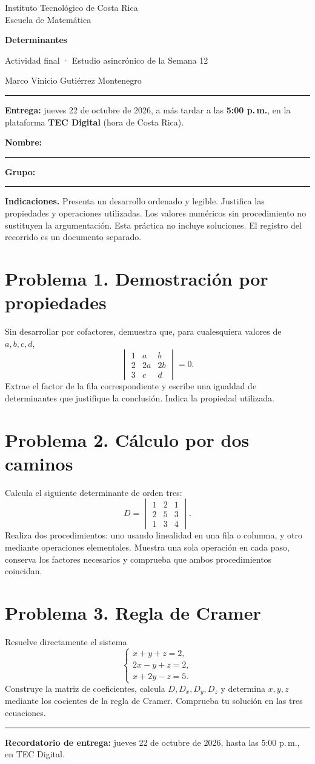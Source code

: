 \documentclass[12pt,a4paper]{article}
\newcommand{\problema}[2]{\section*{Problema #1. #2}}
\begin{document}
\begin{center}
  {\small Instituto Tecnológico de Costa Rica\\Escuela de Matemática}\par
  \vspace{8pt}
  {\LARGE\bfseries Determinantes}\par
  {\large Actividad final · Estudio asincrónico de la Semana 12}\par
  {\normalsize Marco Vinicio Gutiérrez Montenegro}
\end{center}
\vspace{4pt}
\hrule
\vspace{7pt}
\textbf{Entrega:} jueves 22 de octubre de 2026, a más tardar a las
\textbf{5:00 p.\,m.}, en la plataforma \textbf{TEC Digital} (hora de Costa Rica).

\textbf{Nombre:} \rule{85mm}{0.4pt}\quad\textbf{Grupo:} \rule{20mm}{0.4pt}

\textbf{Indicaciones.} Presenta un desarrollo ordenado y legible. Justifica las propiedades y operaciones utilizadas. Los valores numéricos sin procedimiento no sustituyen la argumentación. Esta práctica no incluye soluciones. El registro del recorrido es un documento separado.

\problema{1}{Demostración por propiedades}
Sin desarrollar por cofactores, demuestra que, para cualesquiera valores de $a,b,c,d$,
\[
 \begin{vmatrix}
  1&a&b\\
  2&2a&2b\\
  3&c&d
 \end{vmatrix}=0.
\]
Extrae el factor de la fila correspondiente y escribe una igualdad de determinantes que justifique la conclusión. Indica la propiedad utilizada.

\problema{2}{Cálculo por dos caminos}
Calcula el siguiente determinante de orden tres:
\[
 D=\begin{vmatrix}
  1&2&1\\
  2&5&3\\
  1&3&4
 \end{vmatrix}.
\]
Realiza dos procedimientos: uno usando linealidad en una fila o columna, y otro mediante operaciones elementales. Muestra una sola operación en cada paso, conserva los factores necesarios y comprueba que ambos procedimientos coincidan.

\problema{3}{Regla de Cramer}
Resuelve directamente el sistema
\[
 \begin{cases}
  x+y+z=2,\\
  2x-y+z=2,\\
  x+2y-z=5.
 \end{cases}
\]
Construye la matriz de coeficientes, calcula $D,D_x,D_y,D_z$ y determina $x,y,z$ mediante los cocientes de la regla de Cramer. Comprueba tu solución en las tres ecuaciones.

\vfill
\hrule
\smallskip
{\small\textbf{Recordatorio de entrega:} jueves 22 de octubre de 2026, hasta las 5:00 p.\,m., en TEC Digital.}
\end{document}
